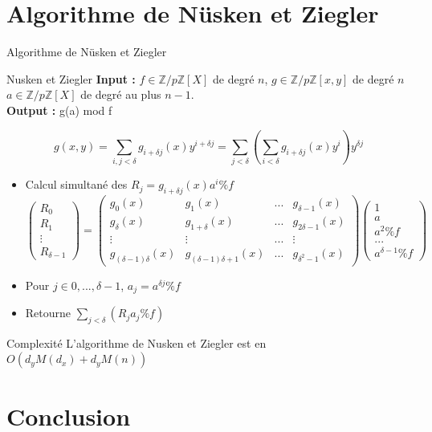 \documentclass[10pt,a4paper]{beamer}
\begin{document}
\section{Algorithme de Nüsken et Ziegler}
\begin{frame}{Algorithme de Nüsken et Ziegler}
    \begin{block}{Nusken et Ziegler}
        \textbf{Input :} $f \in \mathbb{Z}/p\mathbb{Z}[X]$ de degré $n$, $g \in \mathbb{Z}/p\mathbb{Z}[x,y]$ de degré $n$ $a \in \mathbb{Z}/p\mathbb{Z}[X]$ de degré au plus $n-1$. \\
        \textbf{Output :} g(a) mod f
    \end{block}

    \[
    g(x,y) = \sum_{i,j<\delta}g_{i+\delta j}(x)y^{i+\delta j} = \sum_{j<\delta} \left( \sum_{i<\delta} g_{i+\delta j}(x)y^i \right) y^{\delta j}     
    \]

    \begin{itemize}
        \item Calcul simultané des $R_j = g_{i+\delta j}(x)a^i \%f $
            \[
            \begin{pmatrix}
                R_0 \\
                R_1 \\
                \vdots \\
                R_{\delta-1}
            \end{pmatrix}
            =
            \begin{pmatrix}
                g_0(x)&g_1(x)&...&g_{\delta -1}(x) \\
                g_{\delta}(x)&g_{1+\delta}(x)&...&g_{2\delta-1}(x) \\
                \vdots&\vdots&...&\vdots \\
                g_{(\delta-1)\delta}(x)&g_{(\delta-1)\delta+1}(x)&...&g_{\delta^2-1}(x)
            \end{pmatrix}
            \begin{pmatrix}
                1 \\
                a \\
                a^2 \%f \\
                ... \\
                a^{\delta-1} \%f
            \end{pmatrix}
            \]
        \item Pour $j\in{0,...,\delta-1}$, $a_j=a^{\delta j}\% f$
        \item Retourne $\sum_{j<\delta}(R_ja_j \% f)$
    \end{itemize}

    
\end{frame}

\begin{frame}
    \begin{alertblock}{Complexité}
        L'algorithme de Nusken et Ziegler est en $O(d_yM(d_x) + d_yM(n))$
    \end{alertblock}
\end{frame}

\section{Conclusion}
\end{document}
